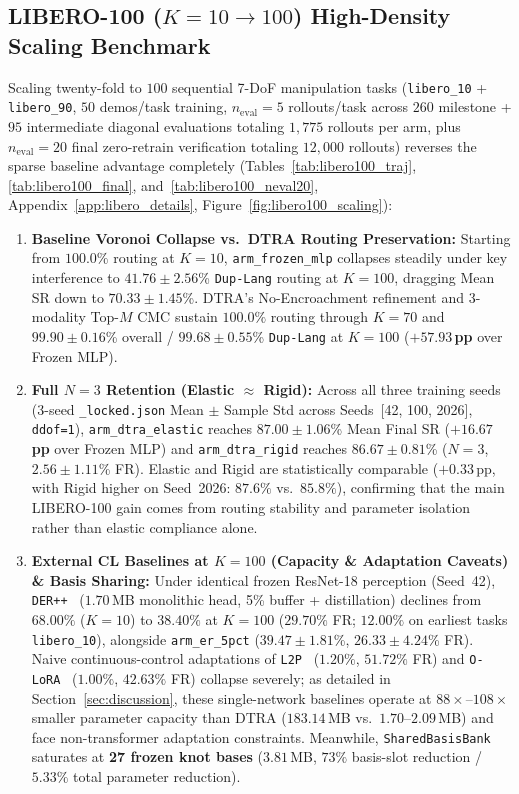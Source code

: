 \documentclass[10pt]{article}
\begin{document}
\subsection{LIBERO-100 (\texorpdfstring{$K=10 \to 100$}{K=10 -> 100}) High-Density Scaling Benchmark}
Scaling twenty-fold to $100$ sequential 7-DoF manipulation tasks (\texttt{libero\_10} + \texttt{libero\_90}, $50$ demos/task training, $n_{\text{eval}}=5$ rollouts/task across $260$ milestone + $95$ intermediate diagonal evaluations totaling $1{,}775$ rollouts per arm, plus $n_{\text{eval}}=20$ final zero-retrain verification totaling $12{,}000$ rollouts) reverses the sparse baseline advantage completely (Tables~\ref{tab:libero100_traj}, \ref{tab:libero100_final}, and~\ref{tab:libero100_neval20}, Appendix~\ref{app:libero_details}, Figure~\ref{fig:libero100_scaling}):
\begin{enumerate}[leftmargin=*,itemsep=1.5pt,topsep=2pt]
  \item \textbf{Baseline Voronoi Collapse vs.\ DTRA Routing Preservation:} Starting from $100.0\%$ routing at $K=10$, \texttt{arm\_frozen\_mlp} collapses steadily under key interference to $\mathbf{41.76 \pm 2.56}$\% \texttt{Dup-Lang} routing at $K=100$, dragging Mean SR down to $\mathbf{70.33 \pm 1.45}$\%. DTRA's No-Encroachment refinement and 3-modality Top-$M$ CMC sustain $100.0\%$ routing through $K=70$ and $\mathbf{99.90 \pm 0.16}$\% overall / $\mathbf{99.68 \pm 0.55}$\% \texttt{Dup-Lang} at $K=100$ (\textbf{$+57.93$\,pp} over Frozen MLP).
  \item \textbf{Full $N=3$ Retention (Elastic $\approx$ Rigid):} Across all three training seeds (3-seed \texttt{\_locked.json} Mean $\pm$ Sample Std across Seeds~[42, 100, 2026], \texttt{ddof=1}), \texttt{arm\_dtra\_elastic} reaches $\mathbf{87.00 \pm 1.06}$\% Mean Final SR (\textbf{$+16.67$\,pp} over Frozen MLP) and \texttt{arm\_dtra\_rigid} reaches $\mathbf{86.67 \pm 0.81}$\% ($N=3$, $2.56 \pm 1.11$\% FR). Elastic and Rigid are statistically comparable ($+0.33\,$pp, with Rigid higher on Seed~2026: $87.6\%$ vs.\ $85.8\%$), confirming that the main LIBERO-100 gain comes from routing stability and parameter isolation rather than elastic compliance alone.
  \item \textbf{External CL Baselines at $K=100$ (Capacity \& Adaptation Caveats) \& Basis Sharing:} Under identical frozen ResNet-18 perception (Seed~42), \texttt{DER++}~\cite{buzzega2020der} ($1.70\,$MB monolithic head, 5\% buffer + distillation) declines from $68.00\%$ ($K=10$) to $38.40\%$ at $K=100$ ($29.70\%$ FR; $12.00\%$ on earliest tasks \texttt{libero\_10}), alongside \texttt{arm\_er\_5pct} ($39.47 \pm 1.81$\%, $26.33 \pm 4.24$\% FR). Naive continuous-control adaptations of \texttt{L2P}~\cite{wang2022l2p} ($1.20\%$, $51.72\%$ FR) and \texttt{O-LoRA}~\cite{wang2023olora} ($1.00\%$, $42.63\%$ FR) collapse severely; as detailed in Section~\ref{sec:discussion}, these single-network baselines operate at $88{\times}\text{--}108{\times}$ smaller parameter capacity than DTRA ($183.14\,$MB vs.\ $1.70\text{--}2.09\,$MB) and face non-transformer adaptation constraints. Meanwhile, \texttt{SharedBasisBank} saturates at \textbf{27 frozen knot bases} ($3.81\,$MB, $73\%$ basis-slot reduction / $5.33\%$ total parameter reduction).

\end{enumerate}
\end{document}
